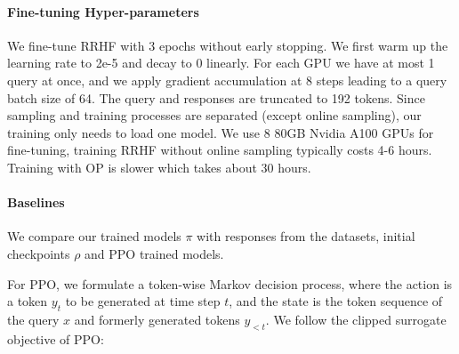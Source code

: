 \begin{minipage}[t]{\textwidth}

\begin{minipage}[b]{0.59\textwidth}
\label{tab:sample}
\centering
\resizebox{1.0\textwidth}{!}{

}
\end{minipage}
\hfill
\begin{minipage}[t]{0.39\textwidth}
\centering

\label{fig:sampling}
\end{minipage}
\end{minipage}

\paragraph{Fine-tuning Hyper-parameters} We fine-tune RRHF with 3 epochs without early stopping. We first warm up the learning rate to 2e-5 and decay to 0 linearly. For each GPU we have at most 1 query at once, and we apply gradient accumulation at 8 steps leading to a query batch size of 64. The query and responses are truncated to 192 tokens. Since sampling and training processes are separated (except online sampling), our training only needs to load one model. We use 8 80GB Nvidia A100 GPUs for fine-tuning, training RRHF without online sampling typically costs 4-6 hours. Training with OP is slower which takes about 30 hours.

\paragraph{Baselines} We compare our trained models $\pi$ with responses from the datasets, initial checkpoints $\rho$ and PPO trained models. 

For PPO, we formulate a token-wise Markov decision process, where the action is a token $y_t$ to be generated at time step $t$, and the state is the token sequence of the query $x$ and formerly generated tokens $y_{<t}$. We follow the clipped surrogate objective of PPO:

